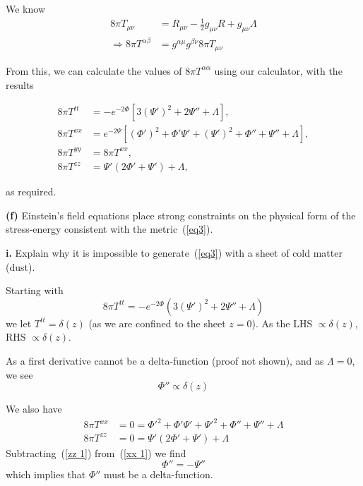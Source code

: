 \documentclass[a4paper]{article} %
\begin{document}
We know
\begin{align}
8\pi T_{\mu\nu}&=R_{\mu\nu}-\frac{1}{2}g_{\mu\nu}R+g_{\mu\nu}\Lambda\\
\Rightarrow 8\pi T^{\alpha\beta}&=g^{\alpha\mu}g^{\beta\nu}8\pi T_{\mu\nu}
\end{align}

From this, we can calculate the values of $8\pi T^{\alpha\alpha}$ using our calculator, with the results

\begin{align}
8\pi T^{tt}&=-e^{-2\Phi}[3(\Psi')^2+2\Psi''+\Lambda],\\
8\pi T^{xx}&=e^{-2\Psi}[(\Phi')^2+\Phi' \Psi' + (\Psi')^2+\Phi'' + \Psi'' + \Lambda],\\
8\pi T^{yy}&=8\pi T^{xx},\\
8\pi T^{zz}&=\Psi'(2\Phi' + \Psi')+\Lambda,
\end{align}

as required.



\begin{framed}
\textbf{(f)} Einstein’s field equations place strong constraints on the physical form of the
stress-energy consistent with the metric~(\ref{eq3}).
\end{framed}

\begin{framed}
\textbf{i.} Explain why it is impossible to generate~(\ref{eq3}) with a sheet of cold matter (dust).
\end{framed}

Starting with
\begin{equation}
8\pi T^{tt}=-e^{-2\Phi}\left(3(\Psi')^2+2\Psi''+\Lambda\right)
\end{equation}
we let $T^{tt}=\delta(z)$ (as we are confined to the sheet $z=0$). As the LHS $\propto \delta(z)$, RHS $\propto \delta(z)$.

As a first derivative cannot be a delta-function (proof not shown), and as $\Lambda=0$, we see
\begin{equation}
\Phi'' \propto \delta(z)
\end{equation}

We also have
\begin{align}
8\pi T^{xx}&=0=\Phi'^2+\Phi'\Psi'+\Psi'^2+\Phi'' + \Psi'' + \Lambda \label{xx 1}\\
8\pi T^{zz}&=0=\Psi'(2\Phi' + \Psi') + \Lambda \label{zz 1}
\end{align}
Subtracting~(\ref{zz 1}) from~(\ref{xx 1}) we find
\begin{equation}
\Phi'' = -\Psi''
\end{equation}
which implies that $\Phi''$ must be a delta-function.
\end{document}
